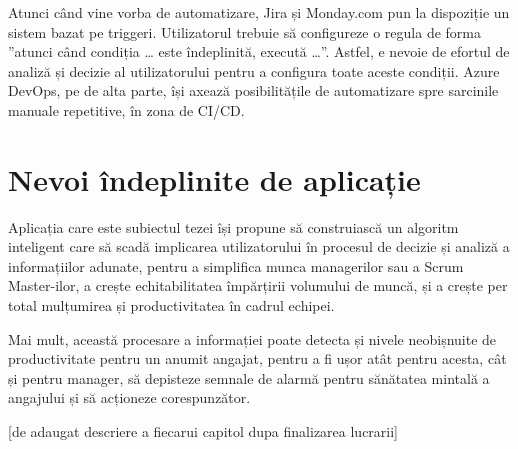 Atunci când vine vorba de automatizare, Jira și Monday.com pun la dispoziție un sistem bazat pe triggeri. Utilizatorul trebuie să configureze o regula de forma ”atunci când condiția … este îndeplinită, execută …”. Astfel, e nevoie de efortul de analiză și decizie al utilizatorului pentru a configura toate aceste condiții. Azure DevOps, pe de alta parte, își axează posibilitățile de automatizare spre sarcinile manuale repetitive, în zona de CI/CD.

\section{Nevoi îndeplinite de aplicație}

Aplicația care este subiectul tezei își propune să construiască un algoritm inteligent care să scadă implicarea utilizatorului în procesul de decizie și analiză a informațiilor adunate, pentru a simplifica munca managerilor sau a Scrum Master-ilor, a crește echitabilitatea împărțirii volumului de muncă, și a crește per total mulțumirea și productivitatea în cadrul echipei.

Mai mult, această procesare a informației poate detecta și nivele neobișnuite de productivitate pentru un anumit angajat, pentru a fi ușor atât pentru acesta, cât și pentru manager, să depisteze semnale de alarmă pentru sănătatea mintală a angajului și să acționeze corespunzător.

[de adaugat descriere a fiecarui capitol dupa finalizarea lucrarii]